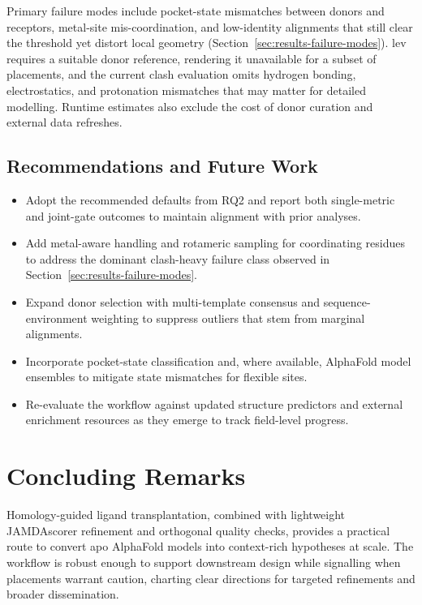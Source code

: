 Primary failure modes include pocket-state mismatches between donors and receptors, metal-site mis-coordination, and low-identity alignments that still clear the threshold yet distort local geometry (Section~\ref{sec:results-failure-modes}). \gls{lev} requires a suitable donor reference, rendering it unavailable for a subset of placements, and the current clash evaluation omits hydrogen bonding, electrostatics, and protonation mismatches that may matter for detailed modelling. Runtime estimates also exclude the cost of donor curation and external data refreshes.

\subsection*{Recommendations and Future Work}
\begin{itemize}
    \item Adopt the recommended defaults from RQ2 and report both single-metric and joint-gate outcomes to maintain alignment with prior analyses.
    \item Add metal-aware handling and rotameric sampling for coordinating residues to address the dominant clash-heavy failure class observed in Section~\ref{sec:results-failure-modes}.
    \item Expand donor selection with multi-template consensus and sequence-environment weighting to suppress outliers that stem from marginal alignments.
    \item Incorporate pocket-state classification and, where available, AlphaFold model ensembles to mitigate state mismatches for flexible sites.
    \item Re-evaluate the workflow against updated structure predictors and external enrichment resources as they emerge to track field-level progress.
\end{itemize}

\section{Concluding Remarks}
Homology-guided ligand transplantation, combined with lightweight JAMDAscorer refinement and orthogonal quality checks, provides a practical route to convert apo AlphaFold models into context-rich hypotheses at scale. The workflow is robust enough to support downstream design while signalling when placements warrant caution, charting clear directions for targeted refinements and broader dissemination.

